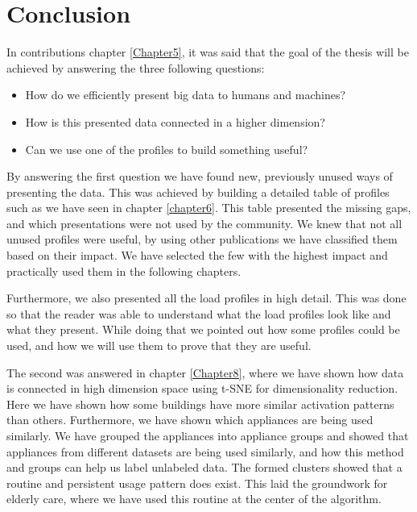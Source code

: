 
\chapter{Conclusion} %

\label{Chapter9} %

In contributions chapter \ref{Chapter5}, it was said that the goal of the thesis will be achieved by answering the three following questions:

\begin{itemize}
	\item How do we efficiently present big data to humans and machines?
	\item How is this presented data connected in a higher dimension?
	\item Can we use one of the profiles to build something useful? 
\end{itemize}

By answering the first question we have found new, previously unused ways of presenting the data.
This was achieved by building a detailed table of profiles such as we have seen in chapter \ref{chapter6}.
This table presented the missing gaps, and which presentations were not used by the community.
We knew that not all unused profiles were useful, by using other publications we have classified them based on their impact. 
We have selected the few with the highest impact and practically used them in the following chapters.

Furthermore, we also presented all the load profiles in high detail. This was done so that the reader was able to understand what the load profiles look like and what they present.
While doing that we pointed out how some profiles could be used, and how we will use them to prove that they are useful. 

The second was answered in chapter \ref{Chapter8}, where we have shown how data is connected in high dimension space
using t-SNE for dimensionality reduction. Here we have shown how some buildings have more similar activation patterns than others.
Furthermore, we have shown which appliances are being used similarly. 
We have grouped the appliances into appliance groups and showed that appliances from different datasets are being used similarly, and how this method and groups can help us label unlabeled data. 
The formed clusters showed that a routine and persistent usage pattern does exist. This laid the groundwork for elderly care, where we have used this routine at the center of the algorithm.

